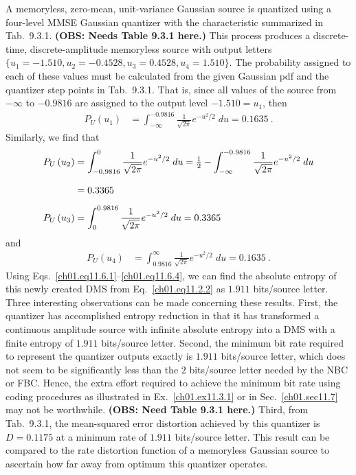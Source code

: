 \begin{example}
\label{ch01.ex11.6.1}
A memoryless, zero-mean, unit-variance Gaussian source is quantized
using a four-level MMSE Gaussian quantizer
with the characteristic
summarized in Tab.~9.3.1.
\textbf{(OBS: Needs Table 9.3.1 here.)}
This process produces a discrete-time, discrete-amplitude
memoryless source with output letters
$\{ u_1 = - 1.510, u_2 = -0.4528, u_3 = 0.4528, u_4 = 1.510 \}$.
The probability assigned to each of these values must
be calculated from the given Gaussian pdf and the quantizer step
points in Tab.~9.3.1.
That is, since all values of the source from $- \infty$ to $-0.9816$
are assigned to the output level $-1.510 = u_1$, then
\begin{align}
         P_U \left( u_1 \right)
     & =
           \int_{-\infty}^{-0.9816} \frac{1}{\sqrt{2 \pi } }
            e^{-u^2 / 2} \; du = 0.1635~.
\label{ch01.eq11.6.1}
\end{align}
Similarly, we find that
\begin{align}
         P_U \left( u_2 \right)
     & =
           \int_{-0.9816}^{0}  \frac{1}{\sqrt{2 \pi } }
            e^{-u^2 / 2} \; du =
           \tfrac{1}{2}
     - \int_{-\infty}^{-0.9816} \frac{1}{\sqrt{2 \pi } }
            e^{-u^2 / 2} \; du                  \nonumber \\
     & = 0.3365 \vphantom{ \int_0^9 }
\label{ch01.eq11.6.2}                           \\
         P_U \left( u_3 \right)
     & =
         \int_{0}^{0.9816} \frac{1}{\sqrt{2 \pi } }
            e^{-u^2 / 2} \; du = 0.3365
\label{ch01.eq11.6.3}
\end{align}
and
\begin{align}
         P_U \left( u_4 \right)
     & =
         \int_{0.9816}^{\infty} \frac{1}{\sqrt{2 \pi } }
            e^{-u^2 / 2} \; du = 0.1635~.
\label{ch01.eq11.6.4}
\end{align}
Using Eqs.~\eqref{ch01.eq11.6.1}--\eqref{ch01.eq11.6.4},
we can find the absolute entropy of this newly created
DMS from Eq.~\eqref{ch01.eq11.2.2} as $1.911$ bits/source letter.
Three interesting observations can be made concerning these results.
First, the quantizer has accomplished entropy reduction in that it
has transformed a continuous amplitude source with infinite absolute
entropy into a DMS with a finite entropy of $1.911$ bits/source letter.
Second, the minimum bit rate required to represent the quantizer
outputs exactly is $1.911$ bits/source letter, which does not
seem to be significantly less than the $2$ bits/source letter
needed by the NBC or FBC.
Hence, the extra effort required to achieve the minimum bit rate
using coding procedures as illustrated in Ex.~\ref{ch01.ex11.3.1}
or in Sec.~\ref{ch01.sec11.7} may not be worthwhile.
\textbf{(OBS: Need Table 9.3.1 here.)}
Third, from Tab.~9.3.1, the mean-squared error
distortion achieved by this quantizer is $D=0.1175$ at a
minimum rate of $1.911$ bits/source letter.
This result can be compared to the rate distortion function
of a memoryless Gaussian source to ascertain how far away from
optimum this quantizer operates.
\end{example}


